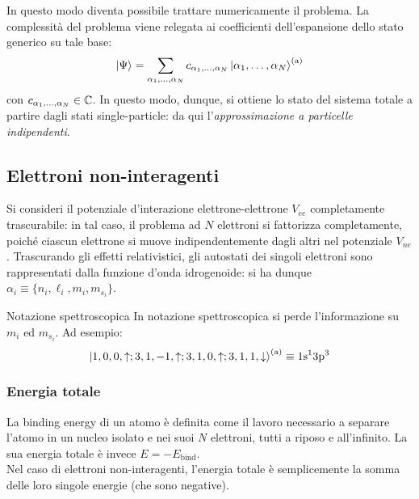 In questo modo diventa possibile trattare numericamente il problema\footnotemark. La complessità del problema viene relegata ai coefficienti dell'espansione dello stato generico su tale base:
\begin{equation}
	\ket{\Psi} = \sum_{\alpha_1 , \dots , \alpha_N} c_{\alpha_1 , \dots , \alpha_N} \ket{\alpha_1 , \dots , \alpha_N}^\text{(a)}
\end{equation}
con $ c_{\alpha_1 , \dots , \alpha_N} \in \mathbb{C} $. In questo modo, dunque, si ottiene lo stato del sistema totale a partire dagli stati single-particle: da qui l'\textit{approssimazione a particelle indipendenti}.


\subsection{Elettroni non-interagenti}

Si consideri il potenziale d'interazione elettrone-elettrone $ V_{ee} $ completamente trascurabile: in tal caso, il problema ad $ N $ elettroni si fattorizza completamente, poiché ciascun elettrone si muove indipendentemente dagli altri nel potenziale $ V_{ne} $. Trascurando gli effetti relativistici, gli autostati dei singoli elettroni sono rappresentati dalla funzione d'onda idrogenoide\footnotemark: si ha dunque $ \alpha_i \equiv \{n_i, \ell_i, m_i, m_{s_i}\} $.


\begin{example}{Notazione spettroscopica}{}
	In notazione spettroscopica si perde l'informazione su $ m_i $ ed $ m_{s_i} $. Ad esempio:
	\begin{equation*}
		\ket{1,0,0,\uparrow ; 3,1,-1,\uparrow ; 3,1,0,\uparrow ; 3,1,1,\downarrow}^\text{(a)} \equiv \text{1s}^1 \text{3p}^3
	\end{equation*}
\end{example}

\subsubsection{Energia totale}

La binding energy di un atomo è definita come il lavoro necessario a separare l'atomo in un nucleo isolato e nei suoi $ N $ elettroni, tutti a riposo e all'infinito. La sua energia totale è invece $ E = - E_\text{bind} $. \\
Nel caso di elettroni non-interagenti, l'energia totale è semplicemente la somma delle loro singole energie (che sono negative).

